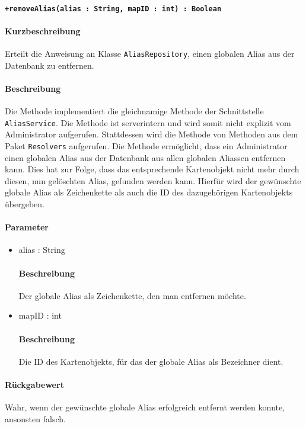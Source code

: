 \paragraph*{\texttt{+removeAlias(alias : String, mapID : int) : Boolean}}%
\paragraph*{Kurzbeschreibung}
Erteilt die Anweisung an Klasse \texttt{AliasRepository}, einen globalen Alias aus der Datenbank zu entfernen.
\paragraph*{Beschreibung}
Die Methode implementiert die gleichnamige Methode der Schnittstelle \texttt{AliasService}.
Die Methode ist serverintern und wird somit nicht explizit vom Administrator aufgerufen.
Stattdessen wird die Methode von Methoden aus dem Paket \texttt{Resolvers} aufgerufen.
Die Methode ermöglicht, dass ein Administrator einen globalen Alias aus der Datenbank aus allen globalen Aliassen entfernen kann.
Dies hat zur Folge, dass das entsprechende Kartenobjekt nicht mehr durch diesen, nun gelöschten Alias, gefunden werden kann.
Hierfür wird der gewünschte globale Alias als Zeichenkette als auch die ID des dazugehörigen Kartenobjekts übergeben.
\paragraph*{Parameter}
\begin{itemize}
    \item alias : String
    		\paragraph*{Beschreibung}
    		Der globale Alias als Zeichenkette, den man entfernen möchte.
    \item mapID : int
    		\paragraph*{Beschreibung}
    		Die ID des Kartenobjekts, für das der globale Alias als Bezeichner dient.
\end{itemize}
\paragraph*{Rückgabewert}
Wahr, wenn der gewünschte globale Alias erfolgreich entfernt werden konnte, ansonsten falsch.
